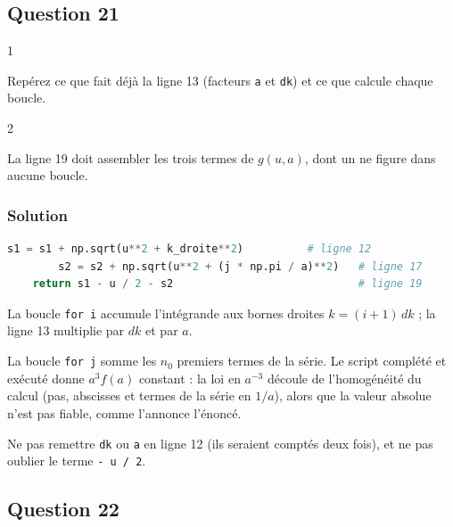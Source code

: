 \documentclass[11pt,a4paper]{article}
\begin{document}
\hypertarget{question-21}{%
\subsection{Question 21}\label{question-21}}

\begin{indication}{1}

Repérez ce que fait déjà la ligne 13 (facteurs \texttt{a} et \texttt{dk}) et ce que calcule chaque boucle.

\end{indication}

\begin{indication}{2}

La ligne 19 doit assembler les trois termes de \(g(u,a)\), dont un ne figure dans aucune boucle.

\end{indication}

\hypertarget{solution-20}{%
\subsubsection{Solution}\label{solution-20}}

\begin{lstlisting}[language=Python]
        s1 = s1 + np.sqrt(u**2 + k_droite**2)          # ligne 12
        s2 = s2 + np.sqrt(u**2 + (j * np.pi / a)**2)   # ligne 17
    return s1 - u / 2 - s2                             # ligne 19
\end{lstlisting}

La boucle \texttt{for\ i} accumule l'intégrande aux bornes droites \(k=(i+1)\,dk\) ; la ligne 13 multiplie par \(dk\) et par \(a\).

La boucle \texttt{for\ j} somme les \(n_0\) premiers termes de la série. Le script complété et exécuté donne \(a^3f(a)\) constant : la loi en \(a^{-3}\) découle de l'homogénéité du calcul (pas, abscisses et termes de la série en \(1/a\)), alors que la valeur absolue n'est pas fiable, comme l'annonce l'énoncé.

\begin{piege}

Ne pas remettre \texttt{dk} ou \texttt{a} en ligne 12 (ils seraient comptés deux fois), et ne pas oublier le terme \texttt{-\ u\ /\ 2}.

\end{piege}

\hypertarget{question-22}{%
\subsection{Question 22}\label{question-22}}
\end{document}

